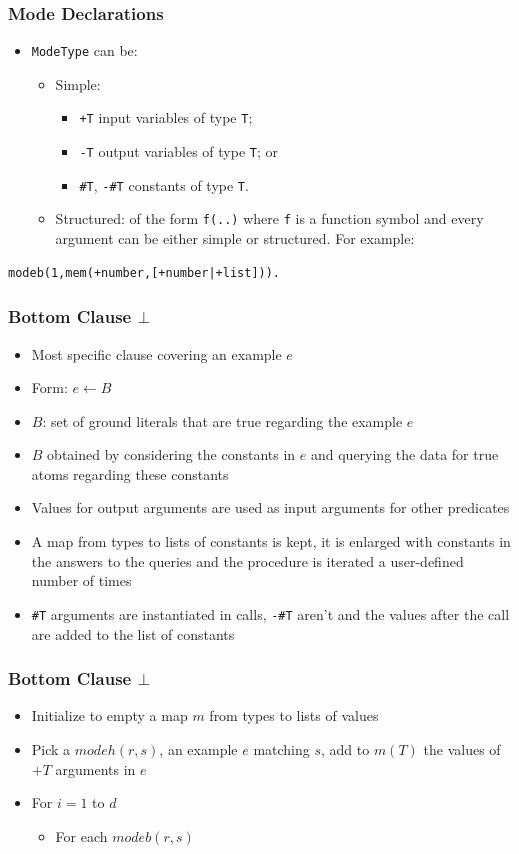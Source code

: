 \documentclass[trans,aspectratio=1610]{beamer}
\begin{document}
\begin{frame}[fragile]
\frametitle{Mode Declarations}
\begin{itemize}
\item \verb|ModeType| can be:
\begin{itemize}
\item
Simple:
\begin{itemize}
\item
\verb|+T| input variables of type \verb|T|;
\item \verb|-T| output variables of type \verb|T|; or
\item \verb|#T|, \verb|-#T| constants of type \verb|T|.
\end{itemize}
\item Structured: of the form \verb|f(..)| where \verb|f| is a function symbol and every argument can be either simple or structured. For example:
\end{itemize}
\end{itemize}
\begin{verbatim}
modeb(1,mem(+number,[+number|+list])).
\end{verbatim}
\end{frame}


\begin{frame}[fragile]
\frametitle{Bottom Clause $\bot$}
\begin{itemize}
\item Most specific clause covering an example $e$
\item Form: $e\leftarrow B$
\item $B$: set of ground literals that are true regarding the example $e$
\item $B$ obtained by considering the constants in $e$ and querying the data  for true atoms regarding these constants
\item Values for output arguments are used as input arguments for other predicates 
\item A map from types to lists of constants is kept, it is enlarged with constants in the answers to the queries and the procedure is iterated a user-defined number of times
\item  \verb|#T| arguments are instantiated in calls, \verb|-#T| aren't and the values after the call are added to the list of constants
\end{itemize}
\end{frame}
%
\begin{frame}
\frametitle{Bottom Clause $\bot$}
\begin{itemize}
\item Initialize to empty a map  $m$ from types to lists of values
\item Pick a $modeh(r,s)$, an example $e$ matching $s$, add to $m(T)$ the values of $+T$ arguments in $e$
\item
For $i=1$ to $d$
\begin{itemize}
\item For each $modeb(r,s)$
\end{itemize}
\end{itemize}
\end{frame}
\end{document}
